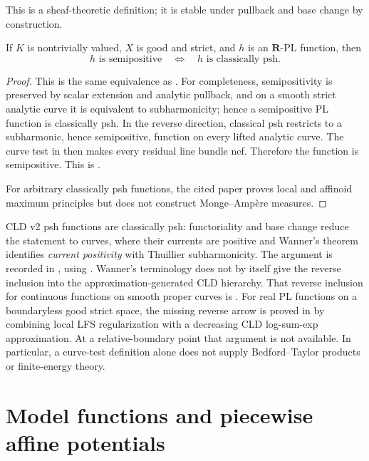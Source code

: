 This is a sheaf-theoretic definition; it is stable under pullback and base
change by construction.

\begin{theorem}\label{thm:gr-classical-pl}
If $K$ is nontrivially valued, $X$ is good and strict, and $h$ is an
$\mathbf R$-PL function, then
\[
                    h\text{ is semipositive}
       \quad\Longleftrightarrow\quad
                    h\text{ is classically psh}.
\]
\end{theorem}
\begin{proof}
This is the same equivalence as .  For
completeness, semipositivity is preserved by scalar extension and analytic
pullback, and on a smooth strict analytic curve it is equivalent to
subharmonicity; hence a semipositive PL function is classically psh.  In the
reverse direction, classical psh restricts to a subharmonic, hence
semipositive, function on every lifted analytic curve.  The curve test in
 then makes every residual line bundle nef.
Therefore the function is semipositive.  This is
\cite[Theorem~4.3]{GR25Classical}.

For arbitrary classically psh functions, the cited paper proves local and
affinoid maximum principles but does not construct Monge--Amp\`ere measures.
\end{proof}

CLD v2 psh functions are classically psh: functoriality and base change
reduce the statement to curves, where their currents are positive and
Wanner's theorem identifies \emph{current positivity} with
Thuillier subharmonicity.  The argument is recorded in
\cite[\S1.2]{GR25Classical}, using \cite[Theorem~4.7]{Wanner19}.  Wanner's
terminology does not by itself give the reverse inclusion into the
approximation-generated CLD hierarchy.  That reverse inclusion for
continuous functions on smooth proper curves is
.  For real PL functions
on a boundaryless good strict space, the missing reverse arrow is proved in
 by combining local LFS regularization
with a decreasing CLD log-sum-exp approximation.  At a relative-boundary
point that argument is not available.  In particular, a curve-test definition
alone does not supply Bedford--Taylor products or finite-energy theory.

\section{Model functions and piecewise affine potentials}
\label{sec:ch18-model-comparison}

